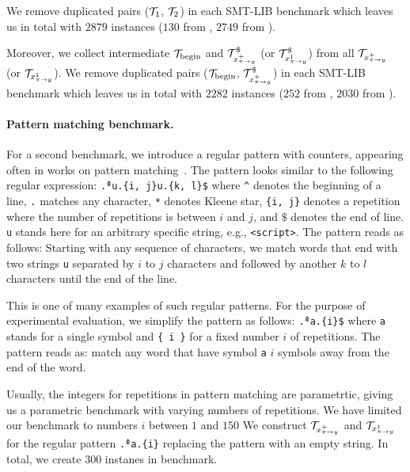 We remove duplicated pairs ($\mathcal{T}_1$, $\mathcal{T}_2$) in each SMT-LIB benchmark which leaves us in total with $2879$ instances ($130$ from \webapp, $2749$ from \transducerPlus).

Moreover, we collect intermediate \nfts $\mathcal{T}_{\text{begin}}$ and $\mathcal{T}^\$_{x^{+}_{\pi \rightarrow y}}$ (or $\mathcal{T}^\$_{x^{1}_{\pi \rightarrow y}}$) from all $\mathcal{T}_{x^{+}_{\pi \rightarrow y}}$ (or $\mathcal{T}_{x^{1}_{\pi \rightarrow y}}$).
We remove duplicated pairs ($\mathcal{T}_{\text{begin}}$, $\mathcal{T}^\$_{x^{+}_{\pi \rightarrow y}}$) in each SMT-LIB benchmark which leaves us in total with $2282$ instances ($252$ from \webapp, $2030$ from \transducerPlus).

\paragraph{Pattern matching benchmark.}

For a second benchmark, we introduce a regular pattern with counters, appearing often in works on pattern matching~\cite{10.1007/978-3-031-30829-1_19}.
The pattern looks similar to the following regular expression:
\texttt{\^.*u.\{i, j\}u.\{k, l\}\$} where
\texttt{\^} denotes the beginning of a line, \texttt{.} matches any character, \texttt{*} denotes Kleene star, \texttt{\{i, j\}} denotes a repetition where the number of repetitions is between $i$ and $j$, and $\$$ denotes the end of line. \texttt{u} stands here for an arbitrary specific string, e.g., \texttt{<script>}.
The pattern reads as follows: Starting with any sequence of characters, we match words that end with two strings \texttt{u} separated by $i$ to $j$ characters and followed by another $k$ to $l$ characters until the end of the line.

This is one of many examples of such regular patterns.
For the purpose of experimental evaluation, we simplify the pattern as follows: \texttt{\^.*a.\{i\}\$} where \texttt{a} stands for a single symbol and \texttt{\{ i \}} for a fixed number $i$ of repetitions.
The pattern reads as: match any word that have symbol \texttt{a} $i$ symbols away from the end of the word.

Usually, the integers for repetitions in pattern matching are parametrtic, giving us a parametric benchmark \symbolFromEnd with varying numbers of repetitions.
We have limited our benchmark to numbers $i$ between $1$ and $150$
We construct $\mathcal{T}_{x^{+}_{\pi \rightarrow y}}$ and $\mathcal{T}_{x^{1}_{\pi \rightarrow y}}$ for the regular pattern \texttt{\^.*a.\{i\}} replacing the pattern with an empty string.
In total, we create $300$ instanes in \symbolFromEnd benchmark.

